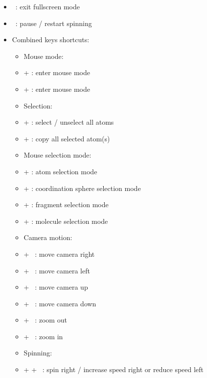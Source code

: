 {\begin{itemize}
\item[] \Esc\ : exit fullscreen mode
\item[] \Spacebar\ : pause / restart spinning
\newpage
\item Combined keys shortcuts:
\begin{itemize}
\item Mouse mode:
\item[] \Alt +  : enter mouse  mode
\item[] \Alt +  : enter mouse  mode \\
\item Selection:
\item[] \Ctrl +  : select / unselect all atoms
\item[] \Ctrl +  : copy all selected atom(s)
\item Mouse selection mode:
\item[] \Shift + : atom selection mode
\item[] \Shift + : coordination sphere selection mode
\item[] \Shift + : fragment selection mode
\item[] \Shift + : molecule selection mode \\	
\item Camera motion:
\item[] \Ctrl + \RArrow\ : move camera right
\item[] \Ctrl + \LArrow\ : move camera left
\item[] \Ctrl + \UArrow\ : move camera up
\item[] \Ctrl + \DArrow\ : move camera down
\item[] \Shift + \UArrow\ : zoom out
\item[] \Shift + \DArrow\ : zoom in \\
\item Spinning: 
\item[] \Ctrl + \Shift + \RArrow\ : spin right / increase speed right or reduce speed left

\end{itemize}
\end{itemize}}
